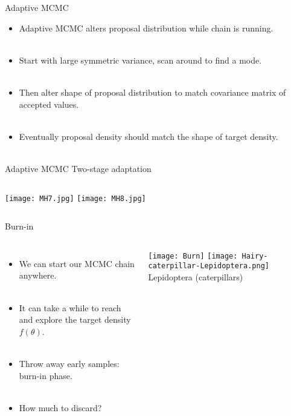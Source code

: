 \documentclass[compress]{beamer}
\begin{document}
\begin{frame}[label=sec-8-6]{Adaptive MCMC}
    \begin{itemize}
        \item \alert{Adaptive MCMC} alters proposal distribution while chain is running. \\~\\
        \item Start with large symmetric variance, scan around to find a mode. \\~\\
        \item Then alter shape of proposal distribution to match covariance matrix of accepted values.\\~\\
        \item Eventually proposal density should match the shape of target density.\\~\\
    \end{itemize}
\end{frame}

\begin{frame}[label=sec-8-7]{Adaptive MCMC}
    Two-stage adaptation
    \begin{columns}[c] 
    \texttt{[image: MH7.jpg]}
    \texttt{[image: MH8.jpg]}
\end{columns}
\end{frame}

\begin{frame}[label=sec-8-8]{Burn-in}
    \begin{columns}[c] 
    \begin{itemize}
        \item We can start our MCMC chain anywhere. \\~\\
        \item It can take a while to reach and explore the target density $f(\theta)$. \\~\\
        \item Throw away early samples: \alert{burn-in} phase. \\~\\
        \item How much to discard? \\~\\
    \end{itemize}
    \texttt{[image: Burn]}
    \texttt{[image: Hairy-caterpillar-Lepidoptera.png]}
    Lepidoptera (caterpillars)
\end{columns}
\end{frame} 
\end{document}
